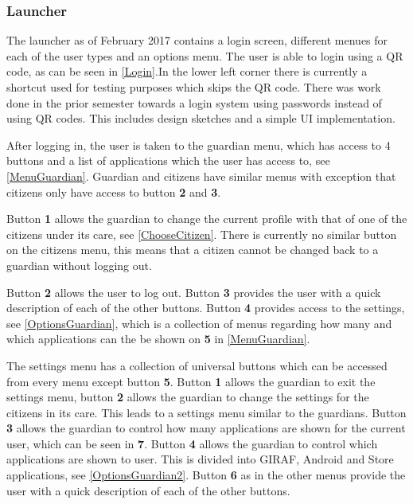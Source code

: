 \subsubsection{Launcher}\label{LauncherReview}
 The launcher as of February 2017 contains
a login screen, different menues for each of the user types and an options menu. The user is able to login using a QR
code, as can be seen in \autoref{Login}.In the lower left corner there is
currently a shortcut used for testing purposes which skips the QR code. There
was work done in the prior semester towards a login system using passwords
instead of using QR codes. This includes design sketches and a simple UI
implementation.


After logging in, the user is taken to the guardian menu, which has access to 4
buttons and a list of applications which the user has access to,
see \autoref{MenuGuardian}. Guardian and citizens have similar menus with
exception that citizens only have access to button \textbf{2} and \textbf{3}.


Button \textbf{1} allows the guardian to change the current profile with that of
one of the citizens under its care, see \autoref{ChooseCitizen}. There is currently no
similar button on the citizens menu, this means that a citizen cannot be changed
back to a guardian without logging out.


Button \textbf{2} allows the user to log out. Button \textbf{3} provides the
user with a quick description of each of the other buttons. Button \textbf{4}
provides access to the settings, see \autoref{OptionsGuardian}, which is a
collection of menus regarding how many and which applications can the be shown
on \textbf{5} in \autoref{MenuGuardian}. 


The settings menu has a collection of universal buttons which can be accessed
from every menu except button \textbf{5}. Button \textbf{1} allows the guardian
to exit the settings menu, button \textbf{2} allows the guardian to change the settings for
the citizens in its care. This leads to a settings menu similar to the guardians.
Button \textbf{3} allows the guardian to control how many applications are
shown for the current user, which can be seen in \textbf{7}. Button \textbf{4}
allows the guardian to control which applications are shown to user. This is
divided into GIRAF, Android and Store applications, see
\autoref{OptionsGuardian2}. Button \textbf{6} as in the other menus provide the
user with a quick description of each of the other buttons.

